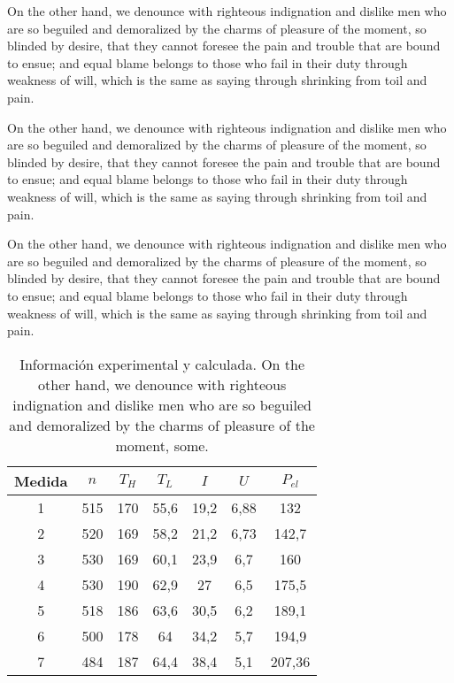 On the other hand, we denounce with righteous indignation and dislike men who
are so beguiled and demoralized by the charms of pleasure of the moment, so
blinded by desire, that they cannot foresee the pain and trouble that are bound
to ensue; and equal blame belongs to those who fail in their duty through
weakness of will, which is the same as saying through shrinking from toil and
pain.

On the other hand, we denounce with righteous indignation and dislike men who
are so beguiled and demoralized by the charms of pleasure of the moment, so
blinded by desire, that they cannot foresee the pain and trouble that are bound
to ensue; and equal blame belongs to those who fail in their duty through
weakness of will, which is the same as saying through shrinking from toil and
pain.

On the other hand, we denounce with righteous indignation and dislike men who
are so beguiled and demoralized by the charms of pleasure of the moment, so
blinded by desire, that they cannot foresee the pain and trouble that are bound
to ensue; and equal blame belongs to those who fail in their duty through
weakness of will, which is the same as saying through shrinking from toil and
pain.

\begin{table}[h!]
  \centering
  \renewcommand{\arraystretch}{1.25}
  \setlength{\tabcolsep}{1.5\tabcolsep}
  \caption{Información experimental y calculada. On the other hand, we denounce
    with righteous indignation and dislike men who are so beguiled and
    demoralized by the charms of pleasure of the moment, some.}
  \label{tab:info}
  \begin{tabular}{*7c} \toprule
    Medida & $n$ & $T_H$ & $T_L$ & $I$ & $U$ & $P_{el}$ \\
    \midrule
    1  & 515 & 170 & 55,6 & 19,2  & 6,88 & 132    \\
    2  & 520 & 169 & 58,2 & 21,2  & 6,73 & 142,7  \\
    3  & 530 & 169 & 60,1 & 23,9  & 6,7  & 160    \\
    4  & 530 & 190 & 62,9 & 27    & 6,5  & 175,5  \\
    5  & 518 & 186 & 63,6 & 30,5  & 6,2  & 189,1  \\
    6  & 500 & 178 & 64   & 34,2  & 5,7  & 194,9  \\
    7  & 484 & 187 & 64,4 & 38,4  & 5,1  & 207,36 \\
    \bottomrule
  \end{tabular}
\end{table}

